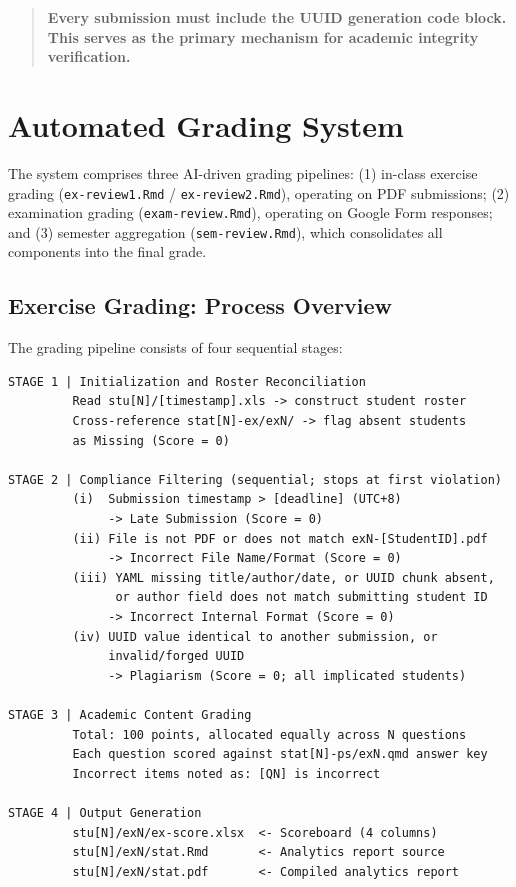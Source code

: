 \documentclass[
]{article}
\begin{document}
\begin{quote}
\textbf{Every submission must include the UUID generation code block.
This serves as the primary mechanism for academic integrity
verification.}
\end{quote}

\newpage

\section{Automated Grading System}\label{automated-grading-system}

The system comprises three AI-driven grading pipelines: (1) in-class
exercise grading (\texttt{ex-review1.Rmd} / \texttt{ex-review2.Rmd}),
operating on PDF submissions; (2) examination grading
(\texttt{exam-review.Rmd}), operating on Google Form responses; and (3)
semester aggregation (\texttt{sem-review.Rmd}), which consolidates all
components into the final grade.

\subsection{Exercise Grading: Process
Overview}\label{exercise-grading-process-overview}

The grading pipeline consists of four sequential stages:

\begin{verbatim}
STAGE 1 | Initialization and Roster Reconciliation
         Read stu[N]/[timestamp].xls -> construct student roster
         Cross-reference stat[N]-ex/exN/ -> flag absent students
         as Missing (Score = 0)

STAGE 2 | Compliance Filtering (sequential; stops at first violation)
         (i)  Submission timestamp > [deadline] (UTC+8)
              -> Late Submission (Score = 0)
         (ii) File is not PDF or does not match exN-[StudentID].pdf
              -> Incorrect File Name/Format (Score = 0)
         (iii) YAML missing title/author/date, or UUID chunk absent,
               or author field does not match submitting student ID
              -> Incorrect Internal Format (Score = 0)
         (iv) UUID value identical to another submission, or
              invalid/forged UUID
              -> Plagiarism (Score = 0; all implicated students)

STAGE 3 | Academic Content Grading
         Total: 100 points, allocated equally across N questions
         Each question scored against stat[N]-ps/exN.qmd answer key
         Incorrect items noted as: [QN] is incorrect

STAGE 4 | Output Generation
         stu[N]/exN/ex-score.xlsx  <- Scoreboard (4 columns)
         stu[N]/exN/stat.Rmd       <- Analytics report source
         stu[N]/exN/stat.pdf       <- Compiled analytics report
\end{verbatim}
\end{document}
